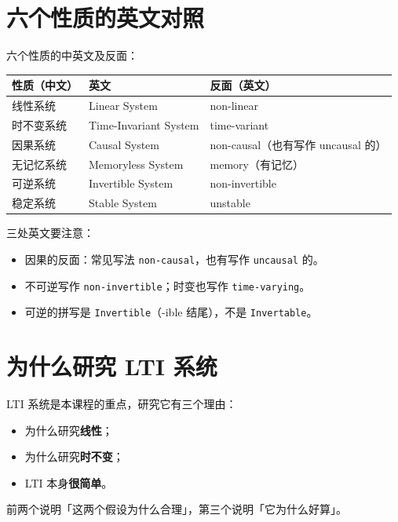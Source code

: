 \documentclass[UTF8,a4paper,11pt]{ctexart}
\newcounter{ex}[section]
\begin{document}
\needspace{11cm}
\section{六个性质的英文对照}
六个性质的中英文及反面：

\begin{center}
\small
\begin{tabular}{@{}lll@{}}
\toprule
性质（中文） & 英文 & 反面（英文）\\
\midrule
线性系统 & Linear System & non-linear\\
时不变系统 & Time-Invariant System & time-variant\\
因果系统 & Causal System & non-causal（也有写作 uncausal 的）\\
无记忆系统 & Memoryless System & memory（有记忆）\\
可逆系统 & Invertible System & non-invertible \\
稳定系统 & Stable System & unstable\\
\bottomrule
\end{tabular}
\end{center}

三处英文要注意：
\begin{itemize}[nosep]
\item 因果的反面：常见写法 \texttt{non-causal}，也有写作 \texttt{uncausal} 的。
\item 不可逆写作 \texttt{non-invertible}；时变也写作 \texttt{time-varying}。
\item 可逆的拼写是 \texttt{Invertible}（-ible 结尾），不是 \texttt{Invertable}。
\end{itemize}

\section{为什么研究 LTI 系统}
LTI 系统是本课程的重点，研究它有三个理由：
\begin{itemize}[nosep,align=left,leftmargin=2em,labelwidth=1.2em,labelsep=0.5em]
\item[\textcircled{1}] 为什么研究\textbf{线性}；
\item[\textcircled{2}] 为什么研究\textbf{时不变}；
\item[\textcircled{3}] LTI 本身\textbf{很简单}。
\end{itemize}
\noindent 前两个说明「这两个假设为什么合理」，第三个说明「它为什么好算」。
\end{document}
